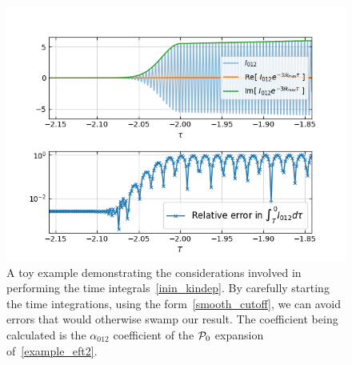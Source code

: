 \begin{figure}[!pth]
\centering
\includegraphics[width=\columnwidth]{plots/time_integrand.png}
\caption{
    A toy example demonstrating the considerations involved in performing the
    time integrals~\eqref{inin_kindep}.
    By carefully starting the time integrations,
    using the form~\eqref{smooth_cutoff}, we can avoid
    errors that would otherwise swamp our result.
    The coefficient being calculated is the
    $\alpha_{012}$ coefficient of the $\mathcal{P}_0$ expansion of~\eqref{example_eft2}.
}\label{fig:time_integrands}
\end{figure}

